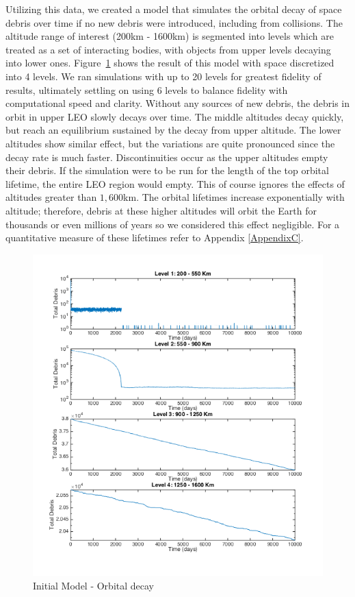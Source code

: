 \documentclass[pre,12pt]{revtex4-1}
\begin{document}
Utilizing this data, we created a model that simulates the orbital decay of space debris over time if no new debris were introduced, including from collisions. The altitude range of interest (200km - 1600km) is segmented into levels which are treated as a set of interacting bodies, with objects from upper levels decaying into lower ones. Figure~\ref{fig:init_model} shows the result of this model with space discretized into 4 levels. We ran simulations with up to 20 levels for greatest fidelity of results, ultimately settling on using 6 levels to balance fidelity with computational speed and clarity. Without any sources of new debris, the debris in orbit in upper LEO slowly decays over time. The middle altitudes decay quickly, but reach an equilibrium sustained by the decay from upper altitude. The lower altitudes show similar effect, but the variations are quite pronounced since the decay rate is much faster. Discontinuities occur as the upper altitudes empty their debris. If the simulation were to be run for the length of the top orbital lifetime, the entire LEO region would empty. This of course ignores the effects of altitudes greater than $1,600$km. The orbital lifetimes increase exponentially with altitude; therefore, debris at these higher altitudes will orbit the Earth for thousands or even millions of years so we considered this effect negligible. For a quantitative measure of these lifetimes refer to Appendix \ref{AppendixC}.

\begin{figure}[h!]
	\includegraphics[width=.6\textwidth]{"Figures/Model1_4_10000"}
	\caption{Initial Model - Orbital decay}
	\label{fig:init_model}
\end{figure}
\end{document}
